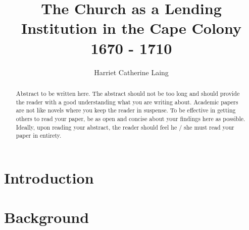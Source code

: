 \documentclass[11pt,preprint, authoryear]{elsarticle}
\numberwithin{equation}{section}
\numberwithin{figure}{section}
\numberwithin{table}{section}
\begin{document}
\begin{frontmatter}  %

\title{The Church as a Lending Institution in the Cape Colony 1670 -
1710}





\author[Add1]{Harriet Catherine Laing}





\address[Add1]{Stellenbosch University, Stellenbosch, South Africa}


\begin{abstract}
\small{
Abstract to be written here. The abstract should not be too long and
should provide the reader with a good understanding what you are writing
about. Academic papers are not like novels where you keep the reader in
suspense. To be effective in getting others to read your paper, be as
open and concise about your findings here as possible. Ideally, upon
reading your abstract, the reader should feel he / she must read your
paper in entirety.
}
\end{abstract}

\vspace{1cm}





\vspace{0.5cm}

\end{frontmatter}



\pagestyle{fancy}
\chead{}
\rhead{}
\lfoot{}
\lhead{}
\cfoot{}


\headsep 35pt %




\hypertarget{introduction}{%
\section{\texorpdfstring{Introduction
\label{Introduction}}{Introduction }}\label{introduction}}

\hypertarget{background}{%
\section{\texorpdfstring{Background
\label{Literature}}{Background }}\label{background}}
\end{document}
